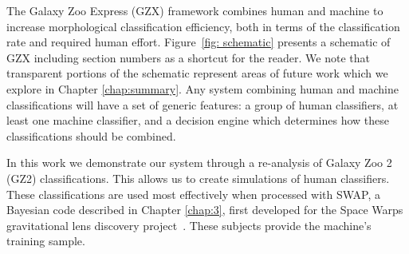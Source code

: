 \begin{figure*}[ht!]
\caption[Schematic of the Galaxy Zoo: Express human+machine hybrid system.]{Schematic of our hybrid system. Humans provide classifications of galaxy images via a web interface. We simulate this with the Galaxy Zoo 2 classification data described in Chapter~\ref{chap:2}. Human classifications are processed with an algorithm described in Chapter~\ref{chap:3}. Subjects that pass a set of thresholds are considered human-retired (fully classified) and provide the training sample for the machine classifier as described in Chapter \ref{chap:4}. The trained machine is applied to all subjects not yet retired. Those that pass an analogous set of machine-specific thresholds are considered machine-retired. The rest remain in the system to be classified by either human or machine. This procedure is repeated  nightly. \label{fig: schematic}}
\end{figure*}



The Galaxy Zoo Express (GZX) framework combines human and machine to increase morphological classification efficiency, both in terms of the classification rate and required human effort. Figure~\ref{fig: schematic} presents a schematic of GZX including section numbers as a shortcut for the reader. We note that transparent portions  of the schematic represent areas of future work which we explore in Chapter \ref{chap:summary}. Any system combining human and machine classifications will have a set of generic features: a group of human classifiers, at least one machine classifier, and a decision engine which determines how these classifications should be combined.

In this work we demonstrate our system through a re-analysis of  Galaxy Zoo 2 (GZ2) classifications. This allows us to  create simulations of human classifiers. These classifications are used most effectively when processed with SWAP, a Bayesian code described in Chapter \ref{chap:3}, first developed for the Space Warps gravitational lens discovery project~\citep{Marshall2016}. These subjects provide the machine's training sample. 

